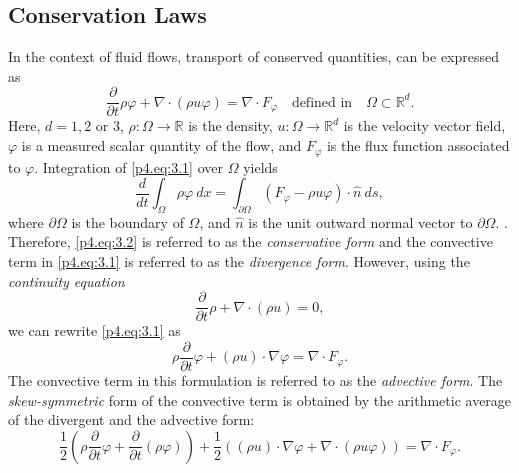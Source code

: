 \subsection{Conservation Laws} \label{p4.sec:skew.1}
In the context of fluid flows, transport of conserved quantities, can be expressed as
\begin{equation} \label{p4.eq:3.1}
	\frac{\partial }{\partial t} \rho \varphi + \nabla \cdot ( \rho u \varphi  ) = \nabla \cdot F_{\varphi}\quad \text{defined in} \quad \Omega \subset \mathbb R^{d}.
\end{equation}
Here, $d = 1,2$ or $3$, $\rho:\Omega\to \mathbb R$ is the density, $u: \Omega \to \mathbb R^{d}$ is the velocity vector field, $\varphi$ is a measured scalar quantity of the flow, and $F_{\varphi}$ is the flux function associated to $\varphi$. Integration of \eqref{p4.eq:3.1} over $ \Omega$ yields
\begin{equation} \label{p4.eq:3.2}
	\frac{d}{dt} \int_{\Omega} \rho \varphi \ dx = \int_{\partial \Omega} (F_{\varphi} - \rho u \varphi) \cdot \hat n\ ds,
\end{equation}
where $\partial \Omega$ is the boundary of $\Omega$, and $\hat n$ is the unit outward normal vector to $\partial \Omega$. . Therefore, \eqref{p4.eq:3.2} is referred to as the \emph{conservative form} and the convective term in \eqref{p4.eq:3.1} is referred to as the \emph{divergence form}. However, using the \emph{continuity equation}
\begin{equation} \label{p4.eq:3.3}
	\frac{\partial }{\partial t} \rho + \nabla \cdot (\rho u) = 0,
\end{equation}
we can rewrite \eqref{p4.eq:3.1} as
\begin{equation} \label{p4.eq:3.4}
	\rho \frac{\partial }{\partial t} \varphi + (\rho u)\cdot \nabla \varphi = \nabla \cdot F_{\varphi}.
\end{equation}
The convective term in this formulation is referred to as the \emph{advective form}. The \emph{skew-symmetric} form of the convective term is obtained by the arithmetic average of the divergent and the advective form:
\begin{equation} \label{p4.eq:3.5}
	\frac{1}{2} \left( \rho \frac{\partial }{\partial t} \varphi + \frac{\partial }{\partial t} (\rho \varphi) \right) + \frac 1 2 \left( (\rho u)\cdot \nabla \varphi + \nabla \cdot (\rho u \varphi) \right) = \nabla \cdot F_{\varphi}.
\end{equation}
